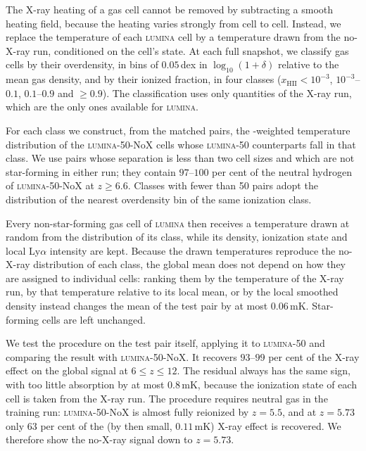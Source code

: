 \documentclass[apj,twocolumn, appendixfloats, twocolappendix, numberedappendix, tighten]{openjournal}
\DeclareRobustCommand{\lumina}{\mbox{\textsc{lumina}}\xspace}
\begin{document}
\begin{appendix}

The X-ray heating of a gas cell cannot be removed by subtracting a smooth heating field, because the heating varies strongly from cell to cell. Instead, we replace the temperature of each \lumina cell by a temperature drawn from the no-X-ray run, conditioned on the cell's state. At each full snapshot, we classify gas cells by their overdensity, in bins of $0.05$\,dex in $\log_{10}(1+\delta)$ relative to the mean gas density, and by their ionized fraction, in four classes ($x_\mathrm{HII} < 10^{-3}$, $10^{-3}$--$0.1$, $0.1$--$0.9$ and $\geq 0.9$). The classification uses only quantities of the X-ray run, which are the only ones available for \lumina.

For each class we construct, from the matched pairs, the -weighted temperature distribution of the \lumina-50-NoX cells whose \lumina-50 counterparts fall in that class. We use pairs whose separation is less than two cell sizes and which are not star-forming in either run; they contain $97$--$100$ per cent of the neutral hydrogen of \lumina-50-NoX at $z \geq 6.6$. Classes with fewer than 50 pairs adopt the distribution of the nearest overdensity bin of the same ionization class.

Every non-star-forming gas cell of \lumina then receives a temperature drawn at random from the distribution of its class, while its density, ionization state and local Ly$\alpha$ intensity are kept. Because the drawn temperatures reproduce the no-X-ray distribution of each class, the global mean does not depend on how they are assigned to individual cells: ranking them by the temperature of the X-ray run, by that temperature relative to its local mean, or by the local smoothed density instead changes the mean of the test pair by at most $0.06$\,mK. Star-forming cells are left unchanged.


We test the procedure on the test pair itself, applying it to \lumina-50 and comparing the result with \lumina-50-NoX. It recovers $93$--$99$ per cent of the X-ray effect on the global signal at $6 \leq z \leq 12$. The residual always has the same sign, with too little absorption by at most $0.8$\,mK, because the ionization state of each cell is taken from the X-ray run. The procedure requires neutral gas in the training run: \lumina-50-NoX is almost fully reionized by $z = 5.5$, and at $z = 5.73$ only $63$ per cent of the (by then small, $0.11$\,mK) X-ray effect is recovered. We therefore show the no-X-ray signal down to $z = 5.73$.


\end{appendix}
\end{document}
